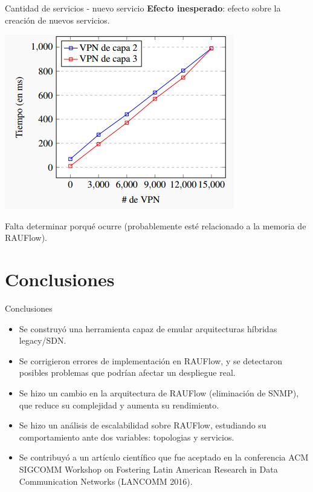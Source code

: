 \documentclass[xcolor=svgnames]{beamer}
\begin{document}
\begin{frame}{Cantidad de servicios - nuevo servicio}
	\textbf{Efecto inesperado}: efecto sobre la creación de nuevos servicios.
	\pause
	\begin{center}
		\includegraphics[scale=0.7]{cummulative_vpn}
	\end{center}
	\pause
	Falta determinar porqué ocurre (probablemente esté relacionado a la memoria de RAUFlow).
\end{frame}


\section{Conclusiones}

\begin{frame}{}
	\tableofcontents[currentsection]
\end{frame}

\begin{frame}{Conclusiones}
	\begin{itemize}
		\item Se construyó una herramienta capaz de emular arquitecturas híbridas legacy/SDN.
		\pause
		\item Se corrigieron errores de implementación en RAUFlow, y se detectaron posibles problemas que podrían afectar un despliegue real.
		\pause
		\item Se hizo un cambio en la arquitectura de RAUFlow (eliminación de SNMP), que reduce su complejidad y aumenta su rendimiento.
		\pause
		\item Se hizo un análisis de escalabilidad sobre RAUFlow, estudiando su comportamiento ante dos variables: topologias y servicios.
		\pause
		\item Se contribuyó a un artículo científico que fue aceptado en la conferencia ACM SIGCOMM Workshop on Fostering Latin American Research in Data Communication Networks (LANCOMM 2016).
	\end{itemize}
\end{frame}
\end{document}
